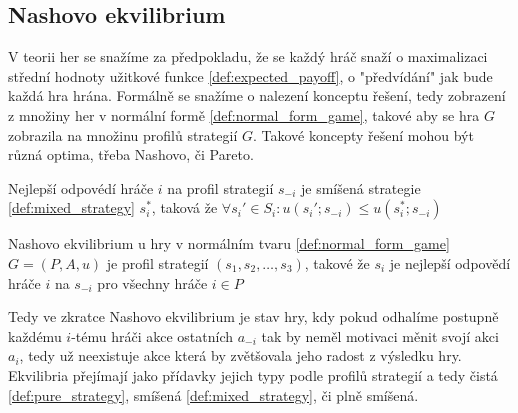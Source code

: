 \subsection{Nashovo ekvilibrium}
V teorii her se snažíme za předpokladu, že se každý hráč snaží o maximalizaci střední hodnoty užitkové funkce \ref{def:expected_payoff}, o "předvídání" jak bude každá hra hrána. 
Formálně se snažíme o nalezení konceptu řešení, tedy zobrazení z množiny her v normální formě \ref{def:normal_form_game}, takové aby se hra $G$ zobrazila na množinu profilů strategií $G$. Takové koncepty řešení mohou být různá optima, třeba Nashovo, či Pareto. 
\begin{definition}
\label{def:best_response}
Nejlepší odpovédí hráče $i$ na profil strategií $s_{-i}$ je smíšená strategie \ref{def:mixed_strategy} $s^*_i$, taková že $\forall s_i' \in S_i: u(s_i'; s_{-i}) \leq u(s^*_i;s_{-i})$
\end{definition}
\begin{definition}
\label{def:nash_equilibrium}
Nashovo ekvilibrium u hry v normálním tvaru \ref{def:normal_form_game} $G = (P, A, u)$ je profil strategií $(s_1, s_2, \dots, s_3)$, takové že $s_i$ je nejlepší odpovědí hráče $i$ na $s_{-i}$ pro všechny hráče $i \in P$
\end{definition}
Tedy ve zkratce Nashovo ekvilibrium je stav hry, kdy pokud odhalíme postupně každému $i$-tému hráči akce ostatních $a_{-i}$ tak by neměl motivaci měnit svojí akci $a_i$, tedy už neexistuje akce která by zvětšovala jeho radost z výsledku hry. 
Ekvilibria přejímají jako přídavky jejich typy podle profilů strategií a tedy čistá \ref{def:pure_strategy}, smíšená \ref{def:mixed_strategy}, či plně smíšená. 


